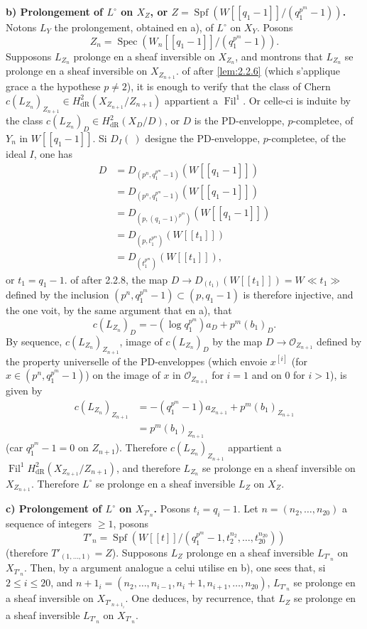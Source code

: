 \documentclass[12pt,a4paper]{article}
\theoremstyle{plain}
\theoremstyle{definition}
\theoremstyle{remark}
\DeclareMathOperator{\Fil}{Fil}
\DeclareMathOperator{\Spec}{Spec}
\DeclareMathOperator{\Spf}{Spf}
\providecommand{\Spec}{\operatorname{Spec}}
\begin{document}
\textbf{b) Prolongement of $L^\circ$ on $X_Z$, or $Z = \Spf(W[[q_1-1]]/(q_1^{p^m} - 1))$.} Notons $L_Y$ the prolongement, obtained en a), of $L^\circ$ on $X_Y$. Posons
\[
Z_n = \Spec(W_n[[q_1-1]]/(q_1^{p^m} - 1)).
\]
Supposons $L_{Z_n}$ prolonge en a sheaf inversible on $X_{Z_n}$, and montrons that $L_{Z_n}$ se prolonge en a sheaf inversible on $X_{Z_{n+1}}$. of after \ref{lem:2.2.6} (which s'applique grace a the hypothese $p \neq 2$), it is enough to verify that the class of Chern $c(L_{Z_n})_{Z_{n+1}} \in H^2_\mathrm{dR}(X_{Z_{n+1}}/Z_{n+1})$ appartient a $\Fil^1$. Or celle-ci is induite by the class $c(L_{Z_n})_D \in H^2_\mathrm{dR}(X_D/D)$, or $D$ is the PD-enveloppe, $p$-completee, of $Y_n$ in $W[[q_1-1]]$. Si $D_I(~)$ designe the PD-enveloppe, $p$-completee, of the ideal $I$, one has
\begin{align*}
D &= D_{(p^n, q_1^{p^m} - 1)}(W[[q_1-1]]) \\
&= D_{(p^n, q_1^{p^m} - 1)}(W[[q_1-1]]) \\
&= D_{(p, (q_1-1)^{p^m})}(W[[q_1-1]]) \\
&= D_{(p, t_1^{p^m})}(W[[t_1]]) \\
&= D_{(t_1^{p^m})}(W[[t_1]]),
\end{align*}
or $t_1 = q_1 - 1$. of after 2.2.8, the map $D \to D_{(t_1)}(W[[t_1]]) = W\ll t_1 \gg$ defined by the inclusion $(p^n, q_1^{p^m} - 1) \subset (p, q_1 - 1)$ is therefore injective, and the one voit, by the same argument that en a), that
\[
c(L_{Z_n})_D = -(\log q_1^{p^m})a_D + p^m (b_1)_D.
\]
By sequence, $c(L_{Z_n})_{Z_{n+1}}$, image of $c(L_{Z_n})_D$ by the map $D \to \mathcal{O}_{Z_{n+1}}$ defined by the property universelle of the PD-enveloppes (which envoie $x^{[i]}$ (for $x \in (p^n, q_1^{p^m} - 1)$) on the image of $x$ in $\mathcal{O}_{Z_{n+1}}$ for $i = 1$ and on $0$ for $i > 1$), is given by
\begin{align*}
c(L_{Z_n})_{Z_{n+1}} &= -(q_1^{p^m} - 1)a_{Z_{n+1}} + p^m (b_1)_{Z_{n+1}} \\
&= p^m (b_1)_{Z_{n+1}}
\end{align*}
(car $q_1^{p^m} - 1 = 0$ on $Z_{n+1}$). Therefore $c(L_{Z_n})_{Z_{n+1}}$ appartient a $\Fil^1 H^2_\mathrm{dR}(X_{Z_{n+1}}/Z_{n+1})$, and therefore $L_{Z_n}$ se prolonge en a sheaf inversible on $X_{Z_{n+1}}$. Therefore $L^\circ$ se prolonge en a sheaf inversible $L_Z$ on $X_Z$.

\textbf{c) Prolongement of $L^\circ$ on $X_{T'_n}$.} Posons $t_i = q_i - 1$. Let $n = (n_2, \ldots, n_{20})$ a sequence of integers $\geqslant 1$, posons
\[
T'_n = \Spf(W[[t]]/(q_1^{p^m} - 1, t_2^{n_2}, \ldots, t_{20}^{n_{20}}))
\]
(therefore $T'_{(1,\ldots,1)} = Z$). Supposons $L_Z$ prolonge en a sheaf inversible $L_{T'_n}$ on $X_{T'_n}$. Then, by a argument analogue a celui utilise en b), one sees that, si $2 \leqslant i \leqslant 20$, and $n+1_i = (n_2, \ldots, n_{i-1}, n_i+1, n_{i+1}, \ldots, n_{20})$, $L_{T'_n}$ se prolonge en a sheaf inversible on $X_{T'_{n+1_i}}$. One deduces, by recurrence, that $L_Z$ se prolonge en a sheaf inversible $L_{T'_n}$ on $X_{T'_n}$.
\end{document}
